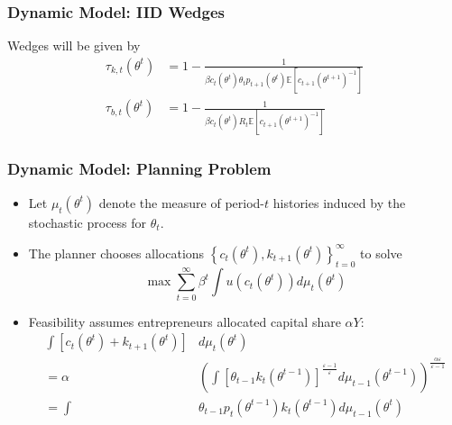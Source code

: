 \documentclass{beamer}
\begin{document}
\begin{frame}
    \frametitle{Dynamic Model: IID Wedges}

    Wedges will be given by 
    \begin{align*}
        \tau_{k,t}\left(\theta^{t}\right)&=1-\frac{1}{\beta c_{t}\left(\theta^{t}\right)\theta_{t}p_{t+1}\left(\theta^{t}\right)\mathbb{E}\left[c_{t+1}\left(\theta^{t+1}\right)^{-1}\right]}\\\tau_{b,t}\left(\theta^{t}\right)&=1-\frac{1}{\beta c_{t}\left(\theta^{t}\right)R_t\mathbb{E}\left[c_{t+1}\left(\theta^{t+1}\right)^{-1}\right]}
    \end{align*}

\end{frame}

\begin{frame}
    \frametitle{Dynamic Model: Planning Problem}

    \begin{itemize}
        \item Let $\mu_{t}\left(\theta^{t}\right)$ denote the measure of period-$t$
        histories induced by the stochastic process for $\theta_{t}$. 
        \item The planner chooses allocations $\left\{ c_{t}\left(\theta^{t}\right),k_{t+1}\left(\theta^{t}\right)\right\} _{t=0}^{\infty}$
        to solve 
        \begin{equation}
        \max\sum_{t=0}^{\infty}\beta^{t}\int u\left(c_{t}\left(\theta^{t}\right)\right)d\mu_{t}\left(\theta^{t}\right)\label{eq:dyn_plan}
        \end{equation} 
        \item Feasibility assumes entrepreneurs allocated capital share \( \alpha Y\):
        \begin{align*}
            \int\left[c_{t}\left(\theta^{t}\right)+k_{t+1}\left(\theta^{t}\right)\right]&d\mu_{t}\left(\theta^{t}\right) \\ = \alpha&\left(\int\left[\theta_{t-1}k_{t}\left(\theta^{t-1}\right)\right]^{\frac{\varepsilon-1}{\varepsilon}}d\mu_{t-1}\left(\theta^{t-1}\right)\right)^{\frac{\alpha\varepsilon}{\varepsilon-1}} \\
            = \int&\theta_{t-1}p_{t}\left(\theta^{t-1}\right)k_{t}\left(\theta^{t-1}\right)d\mu_{t-1}\left(\theta^{t}\right)
        \end{align*}
    \end{itemize}

\end{frame}
\end{document}
